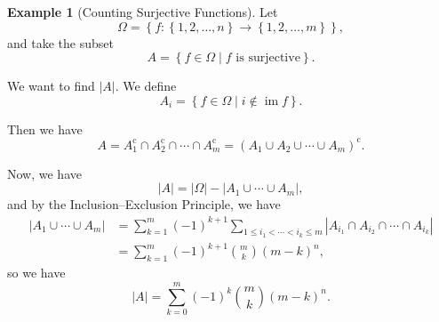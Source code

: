 \documentclass[11pt]{article}
\numberwithin{equation}{section}
\theoremstyle{definition}
\newtheorem{example}[theorem]{Example}
\theoremstyle{remark}
\newcommand{\pqty}[1]{\left(#1\right)}
\newcommand{\Bqty}[1]{\left\{#1\right\}}
\newcommand{\abs}[1]{\left|#1\right|}
\newcommand{\set}[2]{\left\{#1\mid #2\right\}}
\newcommand{\functiondomain}[3]{#1:#2\to #3}
\newcommand{\compl}{^{\mathrm c}}
\DeclareMathOperator{\img}{im}
\begin{document}
\begin{example}[Counting Surjective Functions]\label{probability-example-007}
    \label{probability-ex:counting-surjections}%
    Let
    \[
        \Omega = \Bqty{\functiondomain{f}{\Bqty{1, 2, \ldots, n}}{\Bqty{1, 2, \ldots, m}}},
    \]
    and take the subset
    \[
        A = \set{f \in \Omega}{f \text{ is surjective}}.
    \]

    We want to find \(\abs{A}\). We define
    \[
        A_i = \set{f \in \Omega}{i \notin \img f}.
    \]

    Then we have
    \[
        A = A_1\compl \cap A_2\compl \cap \cdots \cap A_m\compl = \pqty{A_1 \cup A_2 \cup \cdots \cup A_m}\compl.
    \]

    Now, we have
    \[
        \abs{A} = \abs{\Omega} - \abs{A_1 \cup \cdots \cup A_m},
    \]
    and by the Inclusion--Exclusion Principle, we have
    \begin{align*}
        \abs{A_1 \cup \cdots \cup A_m} &= \sum_{k = 1}^{m} \pqty{-1}^{k + 1} \sum_{1 \leq i_1 < \cdots < i_k \leq m} \abs{A_{i_1} \cap A_{i_2} \cap \cdots \cap A_{i_k}} \\
        &= \sum_{k = 1}^{m} \pqty{-1}^{k + 1} \binom{m}{k} \pqty{m - k}^n,
    \end{align*}
    so we have
    \[
        \abs{A} = \sum_{k = 0}^{m} \pqty{-1}^{k} \binom{m}{k} \pqty{m - k}^{n}.
    \]
\end{example}
\end{document}
